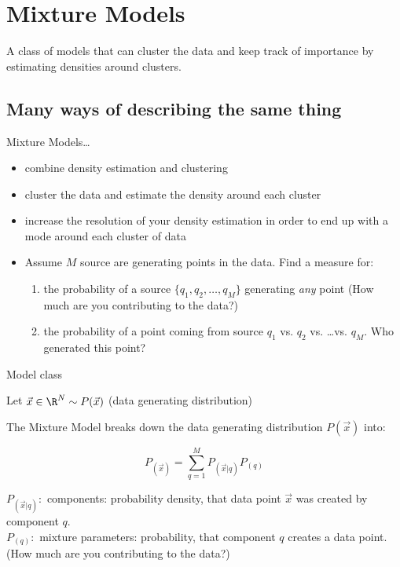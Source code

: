 \section{Mixture Models}


\begin{frame} 
    \begin{center} \large
        A class of models that can cluster the data and keep track of importance by estimating densities around clusters.
    \end{center}
	
\end{frame}

\subsection{Many ways of describing the same thing}

\begin{frame}{\subsecname}

Mixture Models\ldots
\begin{itemize}
\item combine density estimation and clustering
\item cluster the data and estimate the density around each cluster
\item increase the resolution of your density estimation in order to end up with a mode around each cluster of data
\item Assume $M$ source are generating points in the data. Find a measure for:
	\begin{enumerate}
	\item the probability of a source $\{q_1,q_2,\ldots,q_M\}$ generating \emph{any} point (How much are you contributing to the data?)
	\item the probability of a point coming from source $q_1$ vs. $q_2$ vs. \ldots vs. $q_M$. Who generated this point?
	\end{enumerate}
\end{itemize}

\end{frame}

\begin{frame}{Model class}

Let $\vec x \in \R^N \sim P(\vec x)$ (data generating distribution)

The Mixture Model breaks down the data generating distribution $P(\vec x)$ into:

\begin{equation}
	P_{(\vec{x})} = \sum_{q=1}^{M} P_{(\vec{x} | q)} P_{(q)}
\end{equation}
	
$P_{(\vec{x} | q)}:$ components: probability density, that data point $\vec{x}$ was created by component $q$.
\\\vspace{0.3cm}
$P_{(q)}:$ mixture parameters: probability, that component $q$ creates a data point. (How much are you contributing to the data?)

\end{frame}

